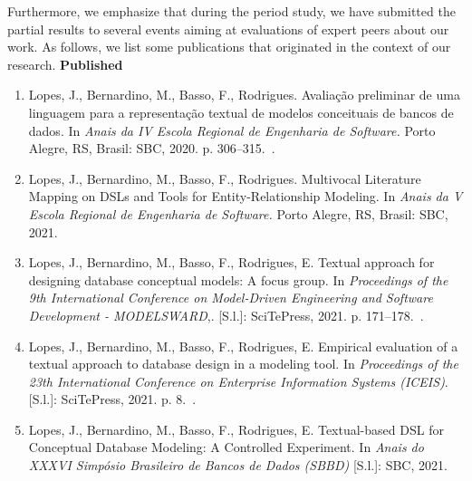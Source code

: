 Furthermore, we emphasize that during the period study, we have submitted the partial results to several events aiming at evaluations of expert peers about our work.
As follows, we list some publications that originated in the context of our research.
\linebreak 
\linebreak
\textbf{Published} 
    \begin{enumerate}[label=\roman*.]
        \item Lopes, J., Bernardino, M., Basso, F., Rodrigues. Avaliação preliminar de uma linguagem para a representação textual de modelos conceituais de bancos de dados. In \textit{Anais da IV Escola Regional de Engenharia de Software.} Porto Alegre, RS, Brasil: SBC, 2020. p. 306–315.~\cite{eres}. 
        \item Lopes, J., Bernardino, M., Basso, F., Rodrigues. Multivocal Literature Mapping on DSLs and Tools for Entity-Relationship Modeling. In \textit{Anais da V Escola Regional de Engenharia de Software.} Porto Alegre, RS, Brasil: SBC, 2021.~\cite{eres:2021}
        \item Lopes, J., Bernardino, M., Basso, F., Rodrigues, E. Textual approach for designing database conceptual models: A focus group. In \textit{Proceedings of the 9th International Conference on Model-Driven Engineering and Software Development - MODELSWARD},. [S.l.]: SciTePress, 2021. p. 171–178.~\cite{modelsward21}. 
        \item Lopes, J., Bernardino, M., Basso, F., Rodrigues, E. Empirical evaluation of a textual approach to database design in a modeling tool. In \textit{Proceedings of the 23th International Conference on Enterprise Information Systems (ICEIS)}. [S.l.]: SciTePress, 2021. p. 8.~\cite{iceis21}. 
        \item Lopes, J., Bernardino, M., Basso, F., Rodrigues, E. Textual-based DSL for Conceptual Database Modeling: A Controlled Experiment. In \textit{Anais do XXXVI Simpósio Brasileiro de Bancos de Dados (SBBD)} [S.l.]: SBC, 2021.~\cite{sbbd:2021}
    \end{enumerate} 

